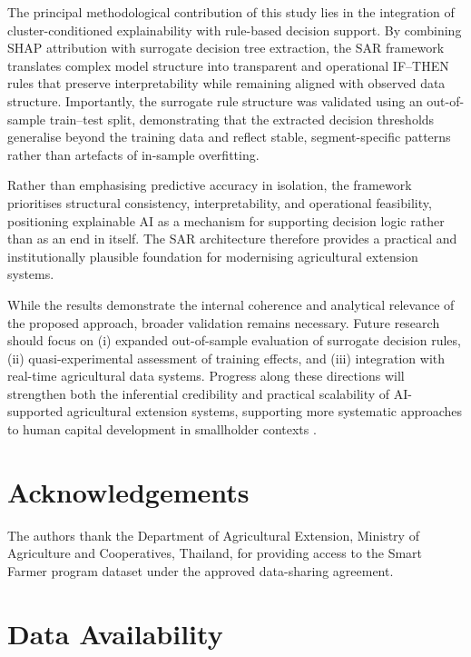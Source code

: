 \documentclass[3p,twocolumn,authoryear]{elsarticle}
\begin{document}
The principal methodological contribution of this study lies in the
integration of cluster-conditioned explainability with rule-based
decision support.
By combining SHAP attribution with surrogate decision tree extraction,
the SAR framework translates complex model structure into transparent and
operational IF--THEN rules that preserve interpretability while remaining
aligned with observed data structure.
Importantly, the surrogate rule structure was validated using an
out-of-sample train--test split, demonstrating that the extracted
decision thresholds generalise beyond the training data and reflect
stable, segment-specific patterns rather than artefacts of in-sample
overfitting.

Rather than emphasising predictive accuracy in isolation, the framework
prioritises structural consistency, interpretability, and operational
feasibility, positioning explainable AI as a mechanism for supporting
decision logic rather than as an end in itself.
The SAR architecture therefore provides a practical and institutionally
plausible foundation for modernising agricultural extension systems.

While the results demonstrate the internal coherence and analytical
relevance of the proposed approach, broader validation remains necessary.
Future research should focus on (i) expanded out-of-sample evaluation of
surrogate decision rules, (ii) quasi-experimental assessment of training
effects, and (iii) integration with real-time agricultural data systems.
Progress along these directions will strengthen both the inferential
credibility and practical scalability of AI-supported agricultural
extension systems, supporting more systematic approaches to human
capital development in smallholder contexts \citep{yang2025,zhang2026}.


\section*{Acknowledgements}

The authors thank the Department of Agricultural Extension, Ministry of
Agriculture and Cooperatives, Thailand, for providing access to the
Smart Farmer program dataset under the approved data-sharing agreement.

\section*{Data Availability}
\end{document}
